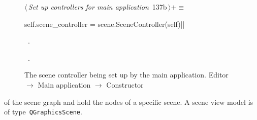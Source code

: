 \documentclass[%
    a4paper,    %
    justified,  %
    nobib,      %
    openany     %
]{tufte-book}
\makeatletter
\renewcommand{\label}[1]{\@tufte@label{##1}}%
\makeatother
\begin{document}
\begin{figure}[!htbp]
\begin{flushleft} \small
\begin{minipage}{\linewidth}\label{scrap87}\raggedright\small
{} $\langle\,${\itshape Set up controllers for main application}\nobreak\ {\footnotesize {137b}}$\,\rangle+\equiv$
\vspace{-1ex}
\begin{pythoncode}
self.scene_controller = scene.SceneController(self)|\NWsep|
\end{pythoncode}
\vspace{1.5ex}
\footnotesize
\begin{list}{}{\setlength{\itemsep}{-\parsep}\setlength{\itemindent}{-\leftmargin}}
\item \NWtxtMacroDefBy\ .
\item \NWtxtMacroRefIn\ .

\item{}
\end{list}
\end{minipage}\vspace{4ex}
\end{flushleft}
\caption{The scene controller being set up by the main application.
  \newline{}\newline{}Editor $\rightarrow$ Main application $\rightarrow$
  Constructor}
\end{figure}

 of the scene graph
and hold the nodes of a specific scene. A scene view model is of
type~\verb=QGraphicsScene=.
\end{document}
